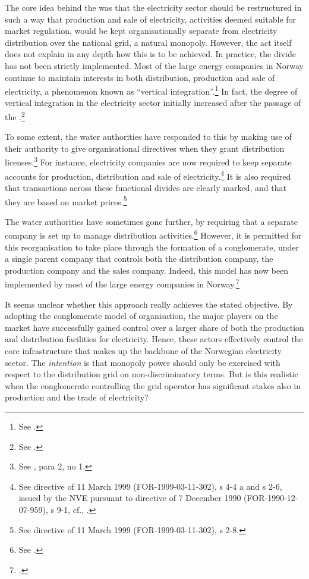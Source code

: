 The core idea behind the \cite{ea90} was that the electricity sector should be restructured in such a way that production and sale of electricity, activities deemed suitable for market regulation, would be kept organisationally separate from electricity distribution over the national grid, a natural monopoly. However, the act itself does not explain in any depth how this is to be achieved. In practice, the divide has not been strictly implemented. Most of the large energy companies in Norway continue to maintain interests in both distribution, production and sale of electricity, a phenomenon known as ``vertical integration''.\footnote{See \cite[580-583]{bibow03}.} In fact, the degree of vertical integration in the electricity sector initially increased after the passage of the \cite{ea90}.\footnote{See \cite[583]{bibow03}.}

To some extent, the water authorities have responded to this by making use of their authority to give organisational directives when they grant distribution licenses.\footnote{See \cite[4-1]{ea90}, para 2, no 1.} For instance, electricity companies are now required to keep separate accounts for production, distribution and sale of electricity.\footnote{See directive of 11 March 1999 (FOR-1999-03-11-302), s 4-4 a and s 2-6, issued by the NVE pursuant to directive of 7 December 1990 (FOR-1990-12-07-959), s 9-1, cf., \cite[10-6]{ea90}.} It is also required that transactions across these functional divides are clearly marked, and that they are based on market prices.\footnote{See directive of 11 March 1999 (FOR-1999-03-11-302), s 2-8.} %

The water authorities have sometimes gone further, by requiring that a separate company is set up to manage distribution activities.\footnote{See \cite[581-582]{bibow03}.} However, it is permitted for this reorganisation to take place through the formation of a conglomerate, under a single parent company that controls both the distribution company, the production company and the sales company. Indeed, this model has now been implemented by most of the large energy companies in Norway.\footcite[582]{bibow03}

It seems unclear whether this approach really achieves the stated objective. By adopting the conglomerate model of organisation, the major players on the market have successfully gained control over a larger share of both the production and distribution facilities for electricity. Hence, these actors effectively control the core infrastructure that makes up the backbone of the Norwegian electricity sector. The {\it intention} is that monopoly power should only be exercised with respect to the distribution grid on non-discriminatory terms. But is this realistic when the conglomerate controlling the grid operator has significant stakes also in production and the trade of electricity?

